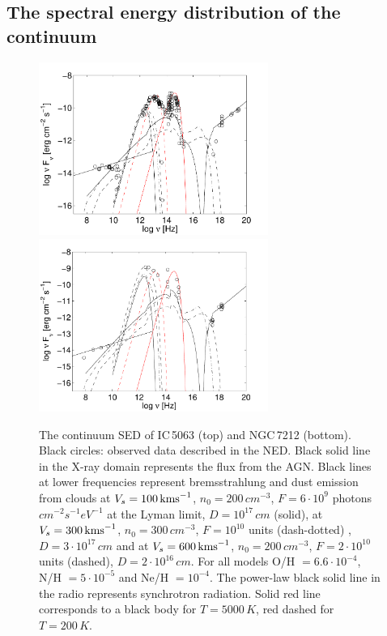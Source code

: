 \documentclass[../main.tex]{subfiles}
\begin{document}
\subsection{The spectral energy distribution of the continuum}

\begin{figure}
\includegraphics[width=7.5cm]{PhD_thesis/images/paper1/sedic50.pdf}
\includegraphics[width=7.5cm]{PhD_thesis/images/paper1/sedn72.pdf}
\caption{The continuum SED of IC\,5063 (top) and NGC\,7212 (bottom).
Black circles: observed data described in the NED.
Black solid line in the X-ray domain represents the flux from the AGN.
Black lines at lower frequencies represent bremsstrahlung and dust emission from clouds at $V_s=100\,\si{\kms}$, $n_0=200\,\si{cm^{-3}}$, $F=6 \cdot 10^9$ photons $\si{cm^{-2} s^{-1} eV^{-1}}$ at the Lyman limit, $ D=10^{17}\,\si{cm}$ (solid), at $V_s=300\,\si{\kms}$, $n_0=300 \,\si{cm^{-3}}$, $F= 10^{10}$ units (dash-dotted) , $ D=3\cdot10^{17}\,\si{ cm}$ and at $V_s= 600\,\si{\kms}$,  $n_0=200\,\si{cm^{-3}}$, $F=2\cdot10^{10}$  units (dashed), $ D=2\cdot10^{16}\,\si{ cm}$. 
For all models O/H $=6.6\cdot10^{-4}$, N/H $= 5\cdot10^{-5}$ and Ne/H $= 10^{-4}$.
The power-law black solid line in the radio represents synchrotron radiation.
Solid red line corresponds to a black body for $T=5000\,\si{K}$, red dashed for $T=200\,\si{K}$.}
\label{fig:SED}
\end{figure}
\end{document}

